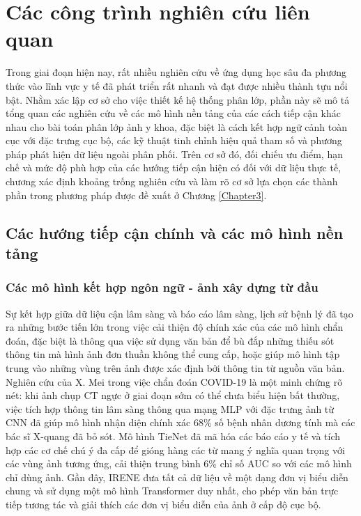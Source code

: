 \chapter{Các công trình nghiên cứu liên quan}
\label{Chapter2}

Trong giai đoạn hiện nay, rất nhiều nghiên cứu về ứng dụng học sâu đa phương thức vào lĩnh vực y tế đã phát triển rất nhanh và đạt được nhiều thành tựu nổi bật. Nhằm xác lập cơ sở cho việc thiết kế hệ thống phân lớp, phần này sẽ mô tả tổng quan các nghiên cứu về các mô hình nền tảng của các cách tiếp cận khác nhau cho bài toán phân lớp ảnh y khoa, đặc biệt là cách kết hợp ngữ cảnh toàn cục với đặc trưng cục bộ, các kỹ thuật tinh chỉnh hiệu quả tham số và phương pháp phát hiện dữ liệu ngoài phân phối. Trên cơ sở đó, đối chiếu ưu điểm, hạn chế và mức độ phù hợp của các hướng tiếp cận hiện có đối với dữ liệu thực tế, chương xác định khoảng trống nghiên cứu và làm rõ cơ sở lựa chọn các thành phần trong phương pháp được đề xuất ở Chương \ref{Chapter3}.

\section{Các hướng tiếp cận chính và các mô hình nền tảng}

\subsection{Các mô hình kết hợp ngôn ngữ - ảnh xây dựng từ đầu}

Sự kết hợp giữa dữ liệu cận lâm sàng và báo cáo lâm sàng, lịch sử bệnh lý đã tạo ra những bước tiến lớn trong việc cải thiện độ chính xác của các mô hình chẩn đoán, đặc biệt là thông qua việc sử dụng văn bản để bù đắp những thiếu sót thông tin mà hình ảnh đơn thuần không thể cung cấp, hoặc giúp mô hình tập trung vào những vùng trên ảnh được xác định bởi thông tin từ nguồn văn bản. Nghiên cứu của X. Mei \cite{XMei} trong việc chẩn đoán COVID-19 là một minh chứng rõ nét: khi ảnh chụp CT ngực ở giai đoạn sớm có thể chưa biểu hiện bất thường, việc tích hợp thông tin lâm sàng thông qua mạng MLP với đặc trưng ảnh từ CNN đã giúp mô hình nhận diện chính xác 68\% số bệnh nhân dương tính mà các bác sĩ X-quang đã bỏ sót. Mô hình TieNet \cite{TieNet} đã mã hóa các báo cáo y tế và tích hợp các cơ chế chú ý đa cấp để gióng hàng các từ mang ý nghĩa quan trọng với các vùng ảnh tương ứng, cải thiện trung bình 6\% chỉ số AUC so với các mô hình chỉ dùng ảnh. Gần đây, IRENE \cite{IRENE} đưa tất cả dữ liệu về một dạng đơn vị biểu diễn chung và sử dụng một mô hình Transformer duy nhất, cho phép văn bản trực tiếp tương tác và giải thích các đơn vị biểu diễn của ảnh ở cấp độ cục bộ.

